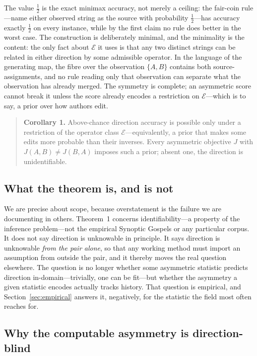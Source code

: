 \documentclass[11pt,letterpaper]{article}
\begin{document}
The value $\tfrac12$ is the exact minimax accuracy, not merely a ceiling: the fair-coin rule---name either observed string as the source with probability $\tfrac12$---has accuracy exactly $\tfrac12$ on every instance, while by the first claim no rule does better in the worst case. The construction is deliberately minimal, and the minimality is the content: the only fact about $\mathcal{E}$ it uses is that any two distinct strings can be related in either direction by some admissible operator. In the language of the generating map, the fibre over the observation $\{A,B\}$ contains both source-assignments, and no rule reading only that observation can separate what the observation has already merged. The symmetry is complete; an asymmetric score cannot break it unless the score already encodes a restriction on $\mathcal{E}$---which is to say, a prior over how authors edit.

\begin{quote}
\textbf{Corollary 1.} Above-chance direction accuracy is possible only under a restriction of the operator class $\mathcal{E}$---equivalently, a prior that makes some edits more probable than their inverses. Every asymmetric objective $J$ with $J(A,B)\neq J(B,A)$ imposes such a prior; absent one, the direction is unidentifiable.
\end{quote}

\subsection{What the theorem is, and is not}

We are precise about scope, because overstatement is the failure we are documenting in others. Theorem~1 concerns identifiability---a property of the inference problem---not the empirical Synoptic Gospels or any particular corpus. It does not say direction is unknowable in principle. It says direction is unknowable \emph{from the pair alone}, so that any working method must import an assumption from outside the pair, and it thereby moves the real question elsewhere. The question is no longer whether some asymmetric statistic predicts direction in-domain---trivially, one can be fit---but whether the asymmetry a given statistic encodes actually tracks history. That question is empirical, and Section~\ref{sec:empirical} answers it, negatively, for the statistic the field most often reaches for.

\subsection{Why the computable asymmetry is direction-blind}
\end{document}
